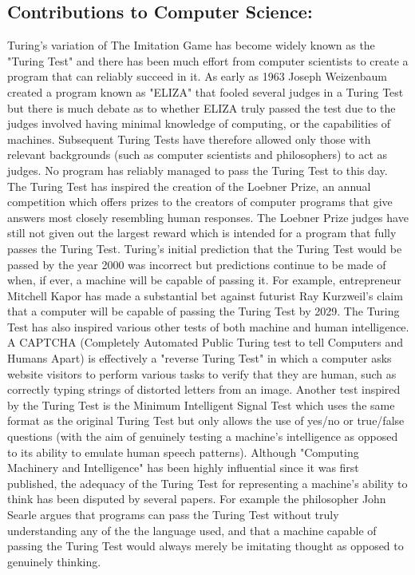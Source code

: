 \documentclass{article}
\begin{document}
\begin{flushleft}
\section{Contributions to Computer Science:}

Turing's variation of The Imitation Game has become widely known as the "Turing Test" and there has been much effort from computer scientists to create a program that can reliably succeed in it. As early as 1963 Joseph Weizenbaum created a program known as "ELIZA" that fooled several judges in a Turing Test but there is much debate as to whether ELIZA truly passed the test due to the judges involved having minimal knowledge of computing, or the capabilities of machines. Subsequent Turing Tests have therefore allowed only those with relevant backgrounds (such as computer scientists and philosophers) to act as judges. No program has reliably managed to pass the Turing Test to this day.
\break
\break
The Turing Test has inspired the creation of the Loebner Prize, an annual competition which offers prizes to the creators of computer programs that give answers most closely resembling human responses. The Loebner Prize judges have still not given out the largest reward which is intended for a program that fully passes the Turing Test.\cite{loebner_prize} Turing's initial prediction that the Turing Test would be passed by the year 2000 was incorrect but predictions continue to be made of when, if ever, a machine will be capable of passing it. For example, entrepreneur Mitchell Kapor has made a substantial bet against futurist Ray Kurzweil’s claim that a computer will be capable of passing the Turing Test by 2029.
\break
\break
The Turing Test has also inspired various other tests of both machine and human intelligence. A CAPTCHA (Completely Automated Public Turing test to tell Computers and Humans Apart) is effectively a "reverse Turing Test" in which a computer asks website visitors to perform various tasks to verify that they are human, such as correctly typing strings of distorted letters from an image.\cite{hasan2016_captcha} Another test inspired by the Turing Test is the Minimum Intelligent Signal Test which uses the same format as the original Turing Test but only allows the use of yes/no or true/false questions (with the aim of genuinely testing a machine's intelligence as opposed to its ability to emulate human speech patterns).\cite{mist2019}
\break
\break
Although "Computing Machinery and Intelligence" has been highly influential since it was first published, the adequacy of the Turing Test for representing a machine’s ability to think has been disputed by several papers. For example the philosopher John Searle argues that programs can pass the Turing Test without truly understanding any of the the language used, and that a machine capable of passing the Turing Test would always merely be imitating thought as opposed to genuinely thinking.\cite{searle1980_mbp}



\end{flushleft}
\end{document}
